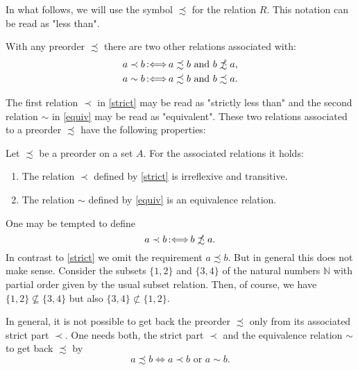 ﻿\documentclass[a4paper,11pt,final]{article}
\newcommand{\nprecsim}{\mathrel{\ooalign{$\precsim$\cr
  \hidewidth\raise.225ex\hbox{$\slash\mkern2mu$}\cr}}\xspace}
\newcommand{\defby}{\mbox{\ensuremath{\,:\Longleftrightarrow\,}}\xspace}
\numberwithin{equation}{subsection}
\begin{document}
In what follows, we will use the symbol $\precsim$ for the relation $R$. This notation can be read as "less than".\par
With any preorder $\precsim$ there are two other relations associated with:
\begin{align}
a \prec b&\defby a\precsim b\text{ and } b\nprecsim a,\label{strict}\\
a \sim b&\defby a\precsim b\text{ and } b\precsim a.\label{equiv}
\end{align}

The first relation $\prec$ in \ref{strict} may be read as "strictly less than" and the second relation $\sim$ in \ref{equiv} may be read as "equivalent". These two relations associated to a preorder $\precsim$ have the following properties:

\begin{prop}
Let $\precsim$ be a preorder on a set $A$. For the associated relations it holds:
\begin{enumerate}
\item The relation $\prec$ defined by \ref{strict} is irreflexive and transitive.
\item The relation $\sim$ defined by \ref{equiv} is an equivalence relation.
\end{enumerate}
\end{prop}

\begin{rem}\label{complement}
One may be tempted to define
\begin{equation*}
a \prec b\defby b \nprecsim a.
\end{equation*}
In contrast to \ref{strict} we omit the requirement $a\precsim b$. But in general this does not make sense. Consider the subsets $\{1,2\}$ and $\{3,4\}$ of the natural numbers $\mathbb{N}$ with partial order given by the usual subset relation. Then, of course, we have $\{1,2\}\nsubseteq \{3,4\}$ but also $\{3,4\}\nsubset\{1,2\}$.
\end{rem}

In general, it is not possible to get back the preorder $\precsim$ only from its associated strict part $\prec$. One needs both, the strict part $\prec$ and the equivalence relation $\sim$ to get back $\precsim$ by
\begin{equation*}
a \precsim b \Longleftrightarrow a \prec b \text{ or } a \sim b.
\end{equation*}
\end{document}
